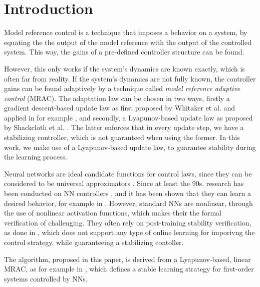 \section{Introduction}
Model reference control is a technique that imposes a behavior on a system, by equating the the output of the model reference with the output of the controlled system. This way, the gains of a pre-defined controller structure can be found. 

However, this only works if the system's dynamics are known exactly, which is often far from reality. If the system's dynamics are not fully known, the controller gains can be found adaptively by a technique called \textit{model reference adaptive control} (MRAC). The adaptation law can be chosen in two ways, firstly a gradient descent-based update law as first proposed by Whitaker et al. \cite{whitaker1959adaptive} and applied in for example \cite{wahby, bosshartComparisonTwoPID2021}, and secondly, a Lyapunov-based update law as proposed by Shackcloth et al. \cite{shackclothSynthesisModelReference1965}. The latter enforces that in every update step, we have a stabilizing controller, which is not guaranteed when using the former. In this work, we make use of a Lyapunov-based update law, to guarantee stability during the learning process.

Neural networks are ideal candidate functions for control laws, since they can be considered to be universal approximators \cite{hornikUniversalApproximationUnknown1990a}. Since at least the 90s, research has been conducted on NN controllers \cite{jiangBriefReviewNeural2017}, and it has been shown that they can learn a desired behavior, for example in \cite{wahby, congPIDLikeNeuralNetwork2009,thanhNonlinearPIDControl2006,norrisNeuralNetworksControl2021}. However, standard NNs are nonlinear, through the use of nonlinear activation functions, which makes their the formal verification of challenging. They often rely on post-training stability verification, as done in \cite{kordaStabilityPerformanceVerification2022, revay_convex_2021}, which does not support any type of online learning for imporivng the control strategy, while guaranteeing a stabilizing contoller.

The algorithm, proposed in this paper, is derived from a Lyapunov-based, linear MRAC, as for example in \cite{lavretskyCombinedCompositeModel2009, slamaModelReferenceAdaptive2018,astromAdaptiveControl2008}, which defines a stable learning strategy for first-order systems controlled by NNs.